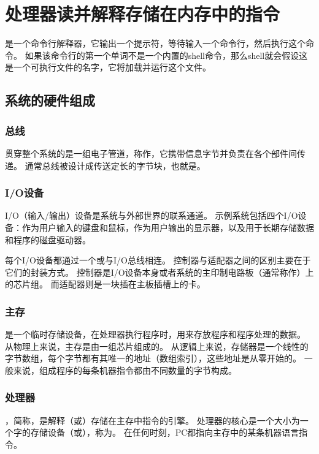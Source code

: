 
\section{处理器读并解释存储在内存中的指令}
{
    是一个命令行解释器，它输出一个提示符，等待输入一个命令行，然后执行这个命令。
    如果该命令行的第一个单词不是一个内置的shell命令，那么shell就会假设这是一个可执行文件的名字，它将加载并运行这个文件。

    \subsection{系统的硬件组成}
    {
        \subsubsection{总线}
        {
            贯穿整个系统的是一组电子管道，称作，它携带信息字节并负责在各个部件间传递。
            通常总线被设计成传送定长的字节块，也就是。
        }

        \subsubsection{I/O设备}
        {
            I/O（输入/输出）设备是系统与外部世界的联系通道。
            示例系统包括四个I/O设备：作为用户输入的键盘和鼠标，作为用户输出的显示器，以及用于长期存储数据和程序的磁盘驱动器。

            每个I/O设备都通过一个或与I/O总线相连。
            控制器与适配器之间的区别主要在于它们的封装方式。
            控制器是I/O设备本身或者系统的主印制电路板（通常称作）上的芯片组。
            而适配器则是一块插在主板插槽上的卡。
        }

        \subsubsection{主存}
        {
            是一个临时存储设备，在处理器执行程序时，用来存放程序和程序处理的数据。
            从物理上来说，主存是由一组芯片组成的。
            从逻辑上来说，存储器是一个线性的字节数组，每个字节都有其唯一的地址（数组索引），这些地址是从零开始的。
            一般来说，组成程序的每条机器指令都由不同数量的字节构成。
        }

        \subsubsection{处理器}
        {
            ，简称，是解释（或）存储在主存中指令的引擎。
            处理器的核心是一个大小为一个字的存储设备（或），称为。
            在任何时刻，PC都指向主存中的某条机器语言指令。

}}}
